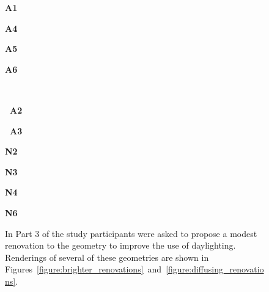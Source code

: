 \begin{figure}[t]
\begin{small}
\begin{minipage}{0.117\textwidth}{\bf A1}\end{minipage}
\begin{minipage}{0.117\textwidth}{\bf A4}\end{minipage}
\begin{minipage}{0.117\textwidth}{\bf A5}\end{minipage}
\begin{minipage}{0.117\textwidth}{\bf A6}\end{minipage}%
\vspace{0.09\textwidth}
\\
\begin{minipage}{0.245\textwidth}{\bf ~A2}\end{minipage}
\begin{minipage}{0.245\textwidth}{\bf ~A3}\end{minipage}
\begin{minipage}{0.117\textwidth}{\bf N2}\end{minipage}
\begin{minipage}{0.117\textwidth}{\bf N3}\end{minipage}
\begin{minipage}{0.117\textwidth}{\bf N4}\end{minipage}
\begin{minipage}{0.117\textwidth}{\bf N6}\end{minipage}\vspace{0.0in}%
\end{small}
  \caption{ In Part 3 of the study participants were asked to propose
    a modest renovation to the geometry to improve the use of
    daylighting.
Renderings of several of these geometries are shown
in
Figures~\ref{figure:brighter_renovations}~and~\ref{figure:diffusing_renovations}.
\label{figure:improved_designs}
  }

\vspace{-0.1in}
\end{figure}
